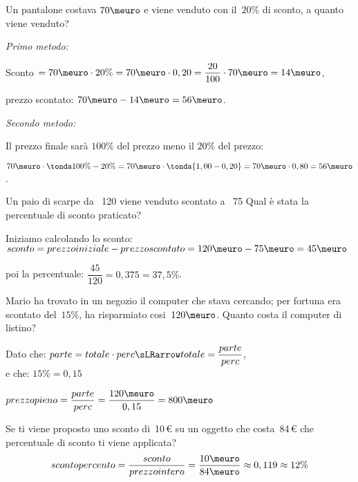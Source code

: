 \begin{esempio}{}{}
Un pantalone costava \(70\meuro\) e viene venduto con il~\(20\%\) di 
sconto, a quanto viene venduto?

\vspace{.5em}
\emph{Primo metodo:} 

Sconto 
\(= 70\meuro \cdot 20\% = 
  70\meuro \cdot 0,20 = 
  \dfrac{20}{100}\cdot 70\meuro = 14\meuro\), \qquad 
  
prezzo scontato: 
\(70\meuro -14\meuro = 
56\meuro\).

\vspace{.5em}
\emph{Secondo metodo:} 

Il prezzo finale sarà \(100\%\) del prezzo meno il \(20\%\) del prezzo:

\(70\meuro \cdot \tonda{100\% - 20\%} = 
70\meuro \cdot \tonda{1,00 - 0,20} = 
70\meuro \cdot 0,80 = 56\meuro\).
\end{esempio}

 \begin{esempio}{}{}
Un paio di scarpe da \meuro\ 120 viene venduto scontato a 
\meuro\ 75 Qual è stata la percentuale di sconto praticato?

Iniziamo calcolando lo sconto: \\
\(sconto = prezzo iniziale - prezzo scontato = 
  120\meuro - 75\meuro = 45 \meuro\)

poi la percentuale: \qquad 
\(\dfrac{45}{120}=0,375 =37,5\%\).
 \end{esempio}

\begin{esempio}{}{}
Mario ha trovato in un negozio il computer che stava cercando; per fortuna 
era scontato del~\(15\%\), ha risparmiato cosi~\(120\meuro\). 
Quanto costa il computer di listino?

Dato che: 
\(parte = totale \cdot perc \sLRarrow 
  totale = \dfrac{parte}{perc}\), \\
e che: \(15\% = 0,15\)

\(prezzo pieno = \dfrac{parte}{perc} = 
  \dfrac{120\meuro}{0,15} = 800\meuro\)
\end{esempio}

\begin{esempio}{}{}
 Se ti viene proposto uno sconto di~10\,€ su un oggetto che costa~84\,€ che 
percentuale di sconto ti viene applicata?
\[sconto percento = \frac{sconto}{prezzointero} =
  \frac{10\meuro}{84\meuro} \approx
  0,119 \approx 12\%\]
\end{esempio}

